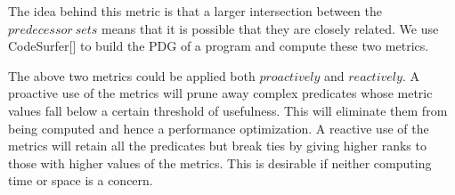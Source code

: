 The idea behind this metric is that a larger intersection between the $predecessor\ sets$ means that it is possible that they are closely related.  We use CodeSurfer[] to build the PDG of a program and compute these two metrics.

The above two metrics could be applied both $proactively$ and $reactively$.  A proactive use of the metrics will prune away complex predicates whose metric values fall below a certain threshold of usefulness.  This will eliminate them from being computed and hence a performance optimization.  A reactive use of the metrics will retain all the predicates but break ties by giving higher ranks to those with higher values of the metrics. This is desirable if neither computing time or space is a concern.


